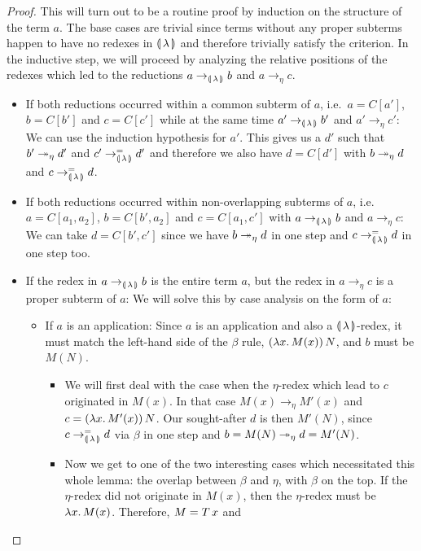 \begin{proof}
  This will turn out to be a routine proof by induction on the structure of
  the term $a$. The base cases are trivial since terms without any proper
  subterms happen to have no redexes in $\llparenthesis \, \lambda \, \rrparenthesis$ and therefore
  trivially satisfy the criterion. In the inductive step, we will proceed
  by analyzing the relative positions of the redexes which led to the
  reductions $a \to_{\llparenthesis \, \lambda \, \rrparenthesis} b$ and $a \to_\eta c$.
  \begin{itemize}
  \item If both reductions occurred within a common subterm of $a$, i.e.\
    $a = C[a']$, $b = C[b']$ and $c = C[c']$ while at the same time
    $a' \to_{\llparenthesis \, \lambda \, \rrparenthesis} b'$ and $a' \to_\eta c'$: We can use the induction
    hypothesis for $a'$. This gives us a $d'$ such that $b' \twoheadrightarrow_\eta d'$
    and $c' \to_{\llparenthesis \, \lambda \, \rrparenthesis}^= d'$ and therefore we also have $d = C[d']$ with
    $b \twoheadrightarrow_\eta d$ and $c \to_{\llparenthesis \, \lambda \, \rrparenthesis}^= d$.
  \item If both reductions occurred within non-overlapping subterms of $a$,
    i.e.\ $a = C[a_1, a_2]$, $b = C[b', a_2]$ and $c = C[a_1, c']$ with
    $a \to_{\llparenthesis \, \lambda \, \rrparenthesis} b$ and $a \to_\eta c$: We can take $d = C[b', c']$ since
    we have $b \twoheadrightarrow_\eta d$ in one step and $c \to_{\llparenthesis \, \lambda \, \rrparenthesis}^= d$ in one step
    too.
  \item If the redex in $a \to_{\llparenthesis \, \lambda \, \rrparenthesis} b$ is the entire term $a$, but the
    redex in $a \to_\eta c$ is a proper subterm of $a$: We will solve this
    by case analysis on the form of $a$:
    \begin{itemize}
    \item If $a$ is an application: Since $a$ is an application and also a
      $\llparenthesis \, \lambda \, \rrparenthesis$-redex, it must match the left-hand side of the
      $\beta$ rule, $(\lambda x.\, M(x))\,N$, and $b$ must be $M(N)$.
      \begin{itemize}
      \item We will first deal with the case when the $\eta$-redex which
        lead to $c$ originated in $M(x)$. In that case
        $M(x) \to_\eta M'(x)$ and $c = (\lambda x.\, M'(x))\,N$. Our
        sought-after $d$ is then $M'(N)$, since $c \to_{\llparenthesis \, \lambda \, \rrparenthesis}^= d$ via
        $\beta$ in one step and $b = M(N) \twoheadrightarrow_\eta d = M'(N)$.
      \item Now we get to one of the two interesting cases which
        necessitated this whole lemma: the overlap between $\beta$ and
        $\eta$, with $\beta$ on the top. If the $\eta$-redex did not
        originate in $M(x)$, then the $\eta$-redex must be
        $\lambda x.\, M(x)$. Therefore, $M = T\,x$ and

\end{itemize}
\end{itemize}
\end{itemize}
\end{proof}
